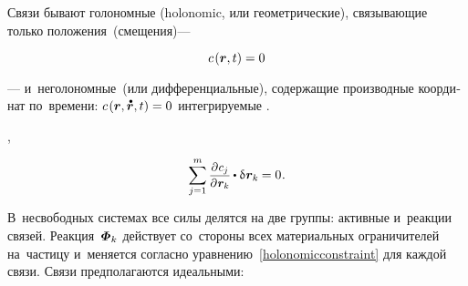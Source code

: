 \begin{otherlanguage}{russian}

Связи бывают
голономные
(holonomic, или геометрические),
связывающие только положения~(смещения)\:---
\ru{,}
\ru{,}

\nopagebreak\vspace{-0.1em}
\begin{equation}\label{holonomicconstraint}
c\hspace{.2ex}(\bm{r}, t) = 0
\end{equation}

\vspace{-0.1em}\noindent
--- и~неголономные~(или дифференциальные),
содержащие производные координат по~времени:
${c\hspace{.2ex}(\locationvector, \mathdotabove{\locationvector}, t) = 0}$
 интегрируемые
.

,

\nopagebreak\vspace{-0.1em}\begin{equation}\label{requirementforvirtualdisplacements}
\displaystyle \sum_{\smash{j=1}}^{m}
\scalebox{.92}{$ \displaystyle
   \frac{\raisemath{-0.12em}{\partial \hspace{.1ex} c_{j}}}{\partial \hspace{.1ex} \locationvector_k} $}
\hspace{-0.1ex} \dotp
\variation{\hspace{.1ex}\locationvector_k}
\hspace{-0.1ex} =
0
\hspace{.1ex} .
\vspace{-0.25em}\end{equation}

В~несвободных системах все силы делятся на две группы: активные и~реакции связей.
Реакция~$\mathboldPhi_k$ действует со~стороны всех материальных ограничителей на~частицу  и~меняется согласно уравнению~\eqref{holonomicconstraint} для каждой связи.
Связи предполагаются идеальными:


\end{otherlanguage}
